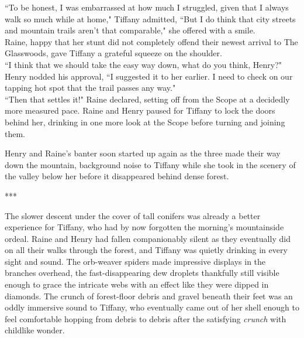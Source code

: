 ``To be honest, I was embarrassed at how much I struggled, given that I always walk so much while at home," Tiffany admitted, ``But I do think that city streets and mountain trails aren't that comparable," she offered with a smile.\\
Raine, happy that her stunt did not completely offend their newest arrival to The Glasswoods, gave Tiffany a grateful squeeze on the shoulder.\\
``I think that we should take the easy way down, what do you think, Henry?"\\
Henry nodded his approval, ``I suggested it to her earlier. I need to check on our tapping hot spot that the trail passes any way."\\
``Then that settles it!" Raine declared, setting off from the Scope at a decidedly more measured pace.
Raine and Henry paused for Tiffany to lock the doors behind her, drinking in one more look at the Scope before turning and joining them.

Henry and Raine's banter soon started up again as the three made their way down the mountain, background noise to Tiffany while she took in the scenery of the valley below her before it disappeared behind dense forest.

\begin{center}
    ***
\end{center}

The slower descent under the cover of tall conifers was already a better experience for Tiffany, who had by now forgotten the morning's mountainside ordeal.
Raine and Henry had fallen companionably silent as they eventually did on all their walks through the forest, and Tiffany was quietly drinking in every sight and sound.
The orb-weaver spiders made impressive displays in the branches overhead, the fast-disappearing dew droplets thankfully still visible enough to grace the intricate webs with an effect like they were dipped in diamonds.
The crunch of forest-floor debris and gravel beneath their feet was an oddly immersive sound to Tiffany, who eventually came out of her shell enough to feel comfortable hopping from debris to debris after the satisfying \textit{crunch} with childlike wonder.\\

